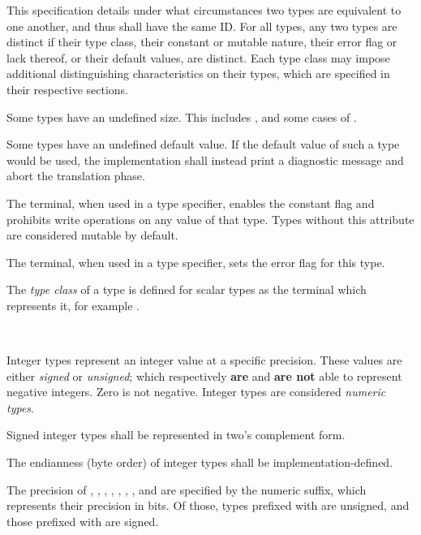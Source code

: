 This specification details under what circumstances two types are equivalent to
one another, and thus shall have the same ID. For all types, any two types are
distinct if their type class, their constant or mutable nature, their error
flag or lack thereof, or their default values, are distinct. Each type class
may impose additional distinguishing characteristics on their types, which are
specified in their respective sections.

\specsubitem
Some types have an undefined size. This includes ,
and some cases of .

\specsubitem
Some types have an undefined default value. If the default value of such a type
would be used, the implementation shall instead print a diagnostic message and
abort the translation phase.

\specsubitem
The  terminal, when used in a type specifier, enables the
constant flag and prohibits write operations on any value of that type. Types
without this attribute are considered mutable by default.

\specsubitem
The \terminal{!} terminal, when used in a type specifier, sets the
error flag for this type.

\specsubitem
The \textit{type class} of a type is defined for scalar types as the terminal
which represents it, for example .


\begin{grammar}
\oneof \\
\end{grammar}

\specsubsubitem
Integer types represent an integer value at a specific precision. These values
are either \textit{signed} or \textit{unsigned}; which respectively
\textbf{are} and \textbf{are not} able to represent negative integers. Zero is
not negative. Integer types are considered \textit{numeric types}.

\specsubsubitem
Signed integer types shall be represented in two's complement form.

\specsubsubitem
The endianness (byte order) of integer types shall be implementation-defined.

\specsubsubitem
The precision of , , ,
, , , , and
 are specified by the numeric suffix, which represents their
precision in bits. Of those, types prefixed with  are unsigned, and
those prefixed with  are signed.

